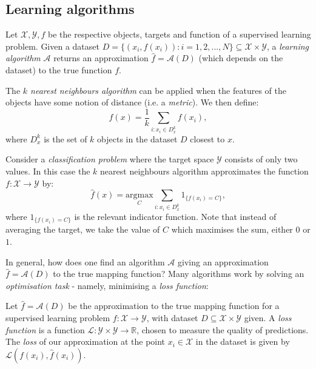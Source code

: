 \newpage
\subsection{Learning algorithms}
\begin{framedef}
Let $\mathcal{X}, \mathcal{Y}, f$ be the respective objects, targets and function of a supervised learning problem. Given a dataset $D = \{(x_i,f(x_i)) : i=1,2,...,N\} \subseteq \mathcal{X} \times \mathcal{Y}$, a \textit{learning algorithm} $\mathcal{A}$ returns an approximation $\hat{f} = \mathcal{A}(D)$ (which depends on the dataset) to the true function $f$.
\end{framedef}

\begin{framedef}
The \textit{$k$ nearest neighbours algorithm} can be applied when the features of the objects have some notion of distance (i.e. a \textit{metric}). We then define:
\begin{equation*}
\hat{f}(x) = \frac{1}{k} \sum_{i : x_i \in D_{x}^k} f(x_i),
\end{equation*}
where $D_{x}^k$ is the set of $k$ objects in the dataset $D$ closest to $x$.
\end{framedef}

\begin{frameex}
Consider a \textit{classification problem} where the target space $\mathcal{Y}$ consists of only two values. In this case the $k$ nearest neighbours algorithm approximates the function $f : \mathcal{X} \rightarrow \mathcal{Y}$ by:
\begin{equation*}
\hat{f}(x) = \underset{C}{\textrm{argmax}} \sum_{i : x_i \in D_x^k} 1_{\{f(x_i) = C\}},
\end{equation*}
where $1_{\{f(x_i) = C\}}$ is the relevant indicator function. Note that instead of averaging the target, we take the value of $C$ which maximises the sum, either $0$ or $1$.
\end{frameex}

In general, how does one find an algorithm $\mathcal{A}$ giving an approximation $\hat{f} = \mathcal{A}(D)$ to the true mapping function? Many algorithms work by solving an \textit{optimisation task} - namely, minimising a \textit{loss function}:

\begin{framedef}
Let $\hat{f} = \mathcal{A}(D)$ be the approximation to the true mapping function for a supervised learning problem $f : \mathcal{X} \rightarrow \mathcal{Y}$, with dataset $D \subseteq \mathcal{X} \times \mathcal{Y}$ given. A \textit{loss function} is a function $\mathcal{L} : \mathcal{Y} \times \mathcal{Y} \rightarrow \mathbb{R}$, chosen to measure the quality of predictions. The \textit{loss} of our approximation at the point $x_i \in \mathcal{X}$ in the dataset is given by $\mathcal{L}(f(x_i), \hat{f}(x_i))$. 
\end{framedef}


